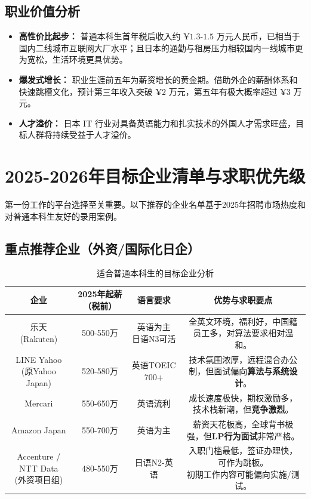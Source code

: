 \documentclass[12pt, a4paper]{ctexart}
\begin{document}
\subsection{职业价值分析}

\begin{itemize}
    \item \textbf{高性价比起步：} 普通本科生首年税后收入约 $\text{¥1.3-1.5}$ 万元人民币，已相当于国内二线城市互联网大厂水平；且日本的通勤与租房压力相较国内一线城市更为宽松，生活环境更具优势。
    \item \textbf{爆发式增长：} 职业生涯前五年为薪资增长的黄金期。借助外企的薪酬体系和快速跳槽文化，预计第三年收入突破 $\text{¥2}$ 万元，第五年有极大概率超过 $\text{¥3}$ 万元。
    \item \textbf{人才溢价：} 日本 IT 行业对具备英语能力和扎实技术的外国人才需求旺盛，目标人群将持续受益于人才溢价。
\end{itemize}

\section{2025-2026年目标企业清单与求职优先级}

第一份工作的平台选择至关重要。以下推荐的企业名单基于2025年招聘市场热度和对普通本科生友好的录用案例。

\subsection{重点推荐企业（外资/国际化日企）}

\begin{table}[h]
    \centering
    \caption{适合普通本科生的目标企业分析}
    \label{tab:target_companies}
    \begin{tabular}{cccc}
        \toprule
        \textbf{企业} & \textbf{2025年起薪（税前）} & \textbf{语言要求} & \textbf{优势与求职要点} \\
        \midrule
        \makecell[c]{乐天 \\ (Rakuten)} & 500-550万 & \makecell[c]{英语为主 \\ 日语N3可活} & 全英文环境，福利好，中国籍员工多，对算法要求相对温和。 \\
        \makecell[c]{LINE Yahoo \\ (原Yahoo Japan)} & 520-580万 & 英语TOEIC 700+ & 技术氛围浓厚，远程混合办公制，但面试偏向\textbf{算法与系统设计}。 \\
        Mercari & 550-650万 & 英语流利 & 成长速度极快，期权激励多，技术栈新潮，但\textbf{竞争激烈}。 \\
        Amazon Japan & 550-700万 & 英语为主 & 薪资天花板高，全球背书极强，但\textbf{LP行为面试}非常严格。 \\
        \makecell[c]{Accenture / NTT Data \\ (外资项目组)} & 480-550万 & 日语N2-英语 & \makecell[c]{入职门槛最低，签证办理快，可作为跳板。\\ 初期工作内容可能偏向实施/测试。} \\
        \bottomrule
    \end{tabular}
\end{table}
\end{document}
